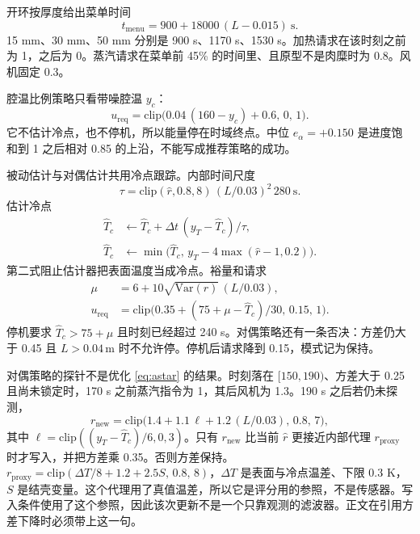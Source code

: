 开环按厚度给出菜单时间
\begin{equation}
t_{\mathrm{menu}}=900+18000\,(L-0.015)\ \mathrm{s}.
\end{equation}
15 mm、30 mm、50 mm 分别是 900 s、1170 s、1530 s。加热请求在该时刻之前为 1，之后为 0。蒸汽请求在菜单前 45\% 的时间里、且原型不是肉糜时为 0.8。风机固定 0.3。

腔温比例策略只看带噪腔温 \(y_c\)：
\begin{equation}
u_{\mathrm{req}}=\mathrm{clip}\big(0.04\,(160-y_c)+0.6,\,0,\,1\big).
\end{equation}
它不估计冷点，也不停机，所以能量停在时域终点。中位 \(e_{\alpha}=+0.150\) 是进度饱和到 1 之后相对 0.85 的上沿，不能写成推荐策略的成功。

被动估计与对偶估计共用冷点跟踪。内部时间尺度
\begin{equation}
\tau=\mathrm{clip}(\hat r,0.8,8)\,(L/0.03)^2\,280\ \mathrm{s}.
\end{equation}
估计冷点
\begin{align}
\hat T_c &\leftarrow \hat T_c+\Delta t\,(y_T-\hat T_c)/\tau,\\
\hat T_c &\leftarrow \min\big(\hat T_c,\, y_T-4\max(\hat r-1,0.2)\big).
\end{align}
第二式阻止估计器把表面温度当成冷点。裕量和请求
\begin{align}
\mu &= 6+10\sqrt{\mathrm{Var}(r)}\,(L/0.03),\\
u_{\mathrm{req}} &= \mathrm{clip}\big(0.35+(75+\mu-\hat T_c)/30,\,0.15,\,1\big).
\end{align}
停机要求 \(\hat T_c>75+\mu\) 且时刻已经超过 240 s。对偶策略还有一条否决：方差仍大于 0.45 且 \(L>0.04\,\mathrm{m}\) 时不允许停。停机后请求降到 0.15，模式记为保持。

对偶策略的探针不是优化 \eqref{eq:astar} 的结果。时刻落在 \([150,190)\)、方差大于 0.25 且尚未锁定时，170 s 之前蒸汽指令为 1，其后风机为 1.3。190 s 之后若仍未探测，
\begin{equation}
r_{\mathrm{new}}=\mathrm{clip}\big(1.4+1.1\,\ell+1.2\,(L/0.03),\,0.8,\,7\big),
\end{equation}
其中 \(\ell=\mathrm{clip}((y_T-\hat T_c)/6,0,3)\)。只有 \(r_{\mathrm{new}}\) 比当前 \(\hat r\) 更接近内部代理 \(r_{\mathrm{proxy}}\) 时才写入，并把方差乘 0.35。否则方差保持。\(r_{\mathrm{proxy}}=\mathrm{clip}(\Delta T/8+1.2+2.5 S,\,0.8,\,8)\)，\(\Delta T\) 是表面与冷点温差、下限 0.3 K，\(S\) 是结壳变量。这个代理用了真值温差，所以它是评分用的参照，不是传感器。写入条件使用了这个参照，因此该次更新不是一个只靠观测的滤波器。正文在引用方差下降时必须带上这一句。

